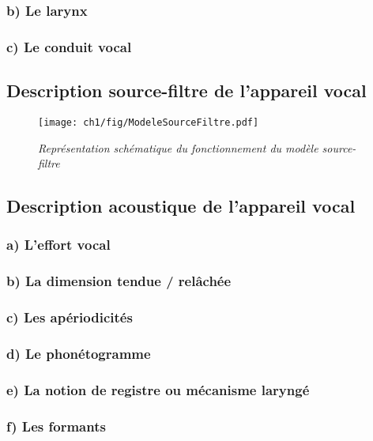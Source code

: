 \subsubsection{b) Le larynx}

\subsubsection{c) Le conduit vocal}



\subsection{Description source-filtre de l'appareil vocal}

\begin{figure}
  \centering
  {\texttt{[image: ch1/fig/ModeleSourceFiltre.pdf]}}
    \caption{{\it Représentation schématique du fonctionnement du modèle source-filtre}}
  \label{Fig:ModeleSourceFiltre}
  \hspace{0.3cm}
\end{figure}


\subsection{Description acoustique de l'appareil vocal}

\subsubsection*{a) L'effort vocal}
\lipsum[1-1]
\subsubsection*{b) La dimension tendue / relâchée}
\lipsum[1-1]
\subsubsection*{c) Les apériodicités}
\lipsum[1-1]
\subsubsection*{d) Le phonétogramme}
\lipsum[1-1]
\subsubsection*{e) La notion de registre ou mécanisme laryngé }


\subsubsection*{f) Les formants}
\lipsum[1-1]

